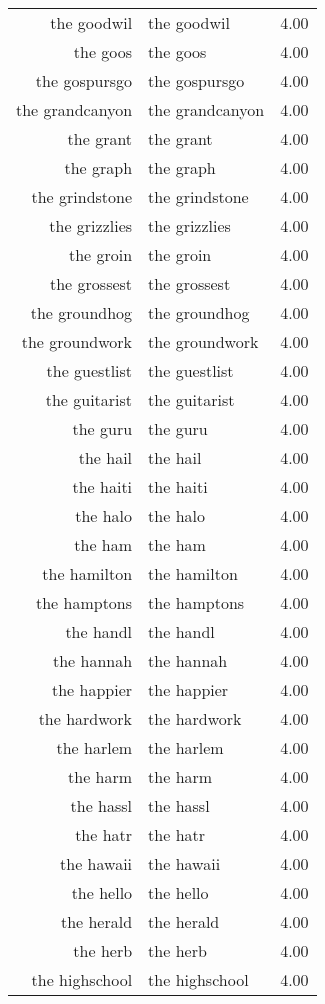 \begin{table}[ht]
\begin{tabular}{rlr}
  the goodwil & the goodwil & 4.00 \\ 
  the goos & the goos & 4.00 \\ 
  the gospursgo & the gospursgo & 4.00 \\ 
  the grandcanyon & the grandcanyon & 4.00 \\ 
  the grant & the grant & 4.00 \\ 
  the graph & the graph & 4.00 \\ 
  the grindstone & the grindstone & 4.00 \\ 
  the grizzlies & the grizzlies & 4.00 \\ 
  the groin & the groin & 4.00 \\ 
  the grossest & the grossest & 4.00 \\ 
  the groundhog & the groundhog & 4.00 \\ 
  the groundwork & the groundwork & 4.00 \\ 
  the guestlist & the guestlist & 4.00 \\ 
  the guitarist & the guitarist & 4.00 \\ 
  the guru & the guru & 4.00 \\ 
  the hail & the hail & 4.00 \\ 
  the haiti & the haiti & 4.00 \\ 
  the halo & the halo & 4.00 \\ 
  the ham & the ham & 4.00 \\ 
  the hamilton & the hamilton & 4.00 \\ 
  the hamptons & the hamptons & 4.00 \\ 
  the handl & the handl & 4.00 \\ 
  the hannah & the hannah & 4.00 \\ 
  the happier & the happier & 4.00 \\ 
  the hardwork & the hardwork & 4.00 \\ 
  the harlem & the harlem & 4.00 \\ 
  the harm & the harm & 4.00 \\ 
  the hassl & the hassl & 4.00 \\ 
  the hatr & the hatr & 4.00 \\ 
  the hawaii & the hawaii & 4.00 \\ 
  the hello & the hello & 4.00 \\ 
  the herald & the herald & 4.00 \\ 
  the herb & the herb & 4.00 \\ 
  the highschool & the highschool & 4.00 \\ 

\end{tabular}
\end{table}
